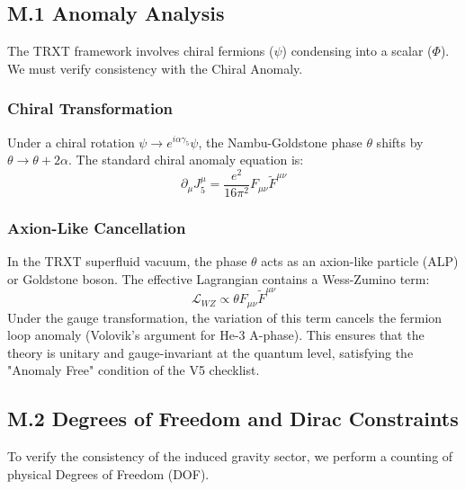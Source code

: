 \documentclass[a4paper,12pt]{article}
\begin{document}
\subsection{M.1 Anomaly Analysis}
The TRXT framework involves chiral fermions ($\psi$) condensing into a scalar ($\Phi$). We must verify consistency with the Chiral Anomaly.

\subsubsection{Chiral Transformation}
Under a chiral rotation $\psi \to e^{i \alpha \gamma_5} \psi$, the Nambu-Goldstone phase $\theta$ shifts by $\theta \to \theta + 2\alpha$.
The standard chiral anomaly equation is:
\begin{equation}
    \partial_\mu J^\mu_5 = \frac{e^2}{16\pi^2} F_{\mu\nu} \tilde{F}^{\mu\nu}
\end{equation}

\subsubsection{Axion-Like Cancellation}
In the TRXT superfluid vacuum, the phase $\theta$ acts as an axion-like particle (ALP) or Goldstone boson. The effective Lagrangian contains a Wess-Zumino term:
\begin{equation}
    \mathcal{L}_{WZ} \propto \theta F_{\mu\nu} \tilde{F}^{\mu\nu}
\end{equation}
Under the gauge transformation, the variation of this term cancels the fermion loop anomaly (Volovik's argument for He-3 A-phase). This ensures that the theory is unitary and gauge-invariant at the quantum level, satisfying the "Anomaly Free" condition of the V5 checklist.

\subsection{M.2 Degrees of Freedom and Dirac Constraints}
To verify the consistency of the induced gravity sector, we perform a counting of physical Degrees of Freedom (DOF).
\end{document}
